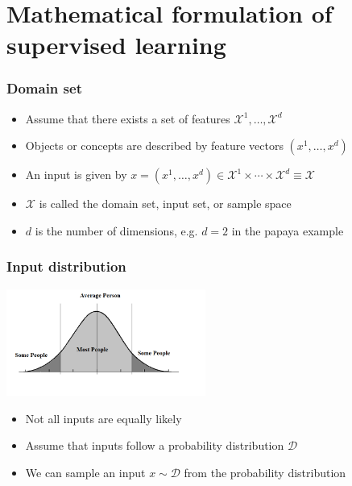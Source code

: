\documentclass[10pt]{beamer}
\begin{document}
\section{Mathematical formulation of supervised learning}

\begin{frame}
  \frametitle{Domain set}
  \begin{itemize}
	\item Assume that there exists a set of {\color{red} features} $\mathcal{X}^1,\ldots,\mathcal{X}^d$
	\item Objects or concepts are described by {\color{green} feature vectors} $(x^1,\ldots,x^d)$
	\item An {\color{cyan} input} is given by $x = (x^1,\ldots,x^d) \in \mathcal{X}^1\times\cdots\times\mathcal{X}^d \equiv \mathcal{X}$
	\item $\mathcal{X}$ is called the {\color{blue} domain set}, {\color{blue} input set}, or {\color{blue} sample space}
	\item $d$ is the number of {\color{purple} dimensions}, e.g. $d=2$ in the papaya example
  \end{itemize}
\end{frame}

\begin{frame}
  \frametitle{Input distribution}
  \begin{center}
	\includegraphics[height=3.5cm]{images/bell.png}
  \end{center}
  \begin{itemize}
	\item Not all inputs are equally likely
	\item Assume that inputs follow a {\color{red} probability distribution} $\mathcal{D}$
	\item We can {\color{green} sample} an input $x\sim\mathcal{D}$ from the probability distribution
  \end{itemize}
\end{frame}
\end{document}
